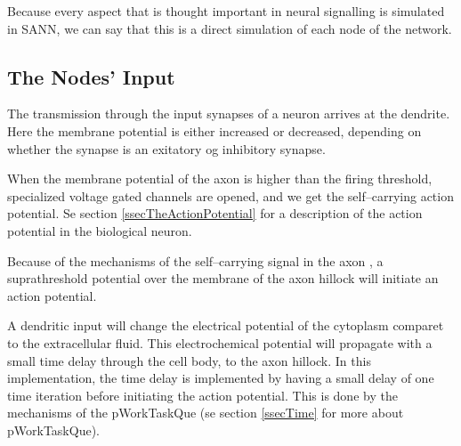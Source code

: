 	Because every aspect that is thought important in neural signalling is simulated in SANN, 
		we can say that this is a direct simulation of each node of the network.   %
	

	\subsection{The Nodes' Input}
	The transmission through the input synapses of a neuron arrives at the dendrite. 
	Here the membrane potential is either increased or decreased, depending on whether the synapse is an exitatory og inhibitory synapse.

	When the membrane potential of the axon is higher than the firing threshold, specialized voltage gated channels are opened, and we get the self--carrying action potential. 
	Se section \ref{ssecTheActionPotential} for a description of the action potential in the biological neuron.
	
	Because of the mechanisms of the self--carrying signal in the axon %
		, a suprathreshold potential over the membrane of the axon hillock will initiate an action potential.

	A dendritic input will change the electrical potential of the cytoplasm comparet to the extracellular fluid. This electrochemical potential will propagate with a small time delay through the cell body, to the axon hillock.
	In this implementation, the time delay is implemented by having a small delay of one time iteration before initiating the action potential.
	This is done by the mechanisms of the pWorkTaskQue (se section \ref{ssecTime} for more about pWorkTaskQue).%

